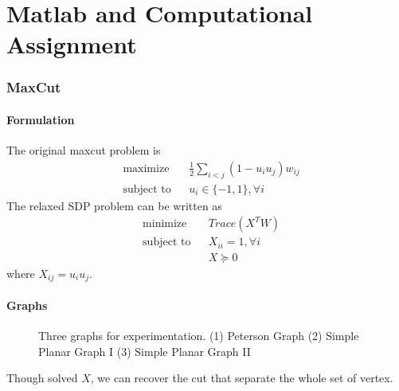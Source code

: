 \documentclass[11pt,a4paper]{article}
\begin{document}
\begin{titlepage}
    \maketitle
\end{titlepage}
\renewcommand{\contentsname}{Table of Contents}
\begin{center} 
    \tableofcontents 
    \listoffigures
\end{center}
\newpage
\newcommand{\optb}{ \begin{equation} \begin{aligned} }
\newcommand{\opte}{ \end{aligned} \end{equation} }
\part{Matlab and Computational Assignment}
\section{MaxCut}
\subsection{Formulation}
The original maxcut problem is 
\optb
&\text{maximize} && \frac{1}{2} \sum_{i<j} (1-u_i u_j)w_{ij} \\
&\text{subject to} && u_i \in \{-1, 1\}, \forall i
\opte
The relaxed SDP problem can be written as
\optb
&\text{minimize} && Trace(X^T W) \\
&\text{subject to} && X_{ii} = 1, \forall i \\
 &               && X \succeq 0
\opte
where $X_{ij} = u_i u_j$.
\subsection{Graphs}
\begin{figure}[h]
    \centering
    \hspace{-1cm}
        \caption{Three graphs for experimentation. (1) Peterson Graph (2)
            Simple Planar Graph I (3) Simple Planar Graph II}
\end{figure}
Though solved $X$, we can recover the cut that separate the whole set of
vertex.
\end{document}
